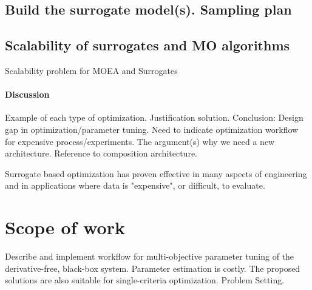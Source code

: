         \subsection{Build the surrogate model(s). Sampling plan}


        \subsection{Scalability of surrogates and MO algorithms}
        Scalability problem for MOEA and Surrogates 


        \paragraph{Discussion}
        Example of each type of optimization. Justification solution.
        Conclusion: Design gap in optimization/parameter tuning. 
        Need to indicate optimization workflow for expensive process/experiments. 
        The argument(s) why we need a new architecture. Reference to composition architecture.

        Surrogate based optimization has proven effective in many aspects of engineering and in applications where data is "expensive", or difficult, to evaluate.



    \section{Scope of work}

        Describe and implement workflow for multi-objective parameter tuning of the derivative-free, black-box system. Parameter estimation is costly. The proposed solutions are also suitable for single-criteria optimization. Problem Setting.

